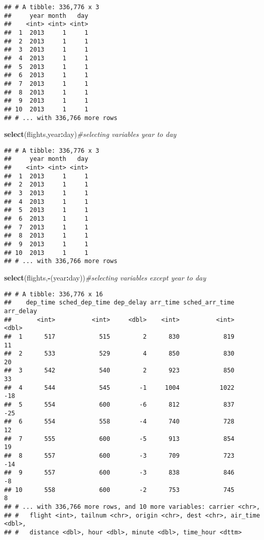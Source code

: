 \documentclass[]{article}
\newenvironment{Shaded}{\begin{snugshade}}{\end{snugshade}}
\newcommand{\CommentTok}[1]{\textcolor[rgb]{0.56,0.35,0.01}{\textit{#1}}}
\newcommand{\KeywordTok}[1]{\textcolor[rgb]{0.13,0.29,0.53}{\textbf{#1}}}
\newcommand{\NormalTok}[1]{#1}
\newcommand{\OperatorTok}[1]{\textcolor[rgb]{0.81,0.36,0.00}{\textbf{#1}}}
\begin{document}
\begin{verbatim}
## # A tibble: 336,776 x 3
##     year month   day
##    <int> <int> <int>
##  1  2013     1     1
##  2  2013     1     1
##  3  2013     1     1
##  4  2013     1     1
##  5  2013     1     1
##  6  2013     1     1
##  7  2013     1     1
##  8  2013     1     1
##  9  2013     1     1
## 10  2013     1     1
## # ... with 336,766 more rows
\end{verbatim}

\begin{Shaded}
\begin{Highlighting}[]
\KeywordTok{select}\NormalTok{(flights,year}\OperatorTok{:}\NormalTok{day)}\CommentTok{#selecting variables year to day}
\end{Highlighting}
\end{Shaded}

\begin{verbatim}
## # A tibble: 336,776 x 3
##     year month   day
##    <int> <int> <int>
##  1  2013     1     1
##  2  2013     1     1
##  3  2013     1     1
##  4  2013     1     1
##  5  2013     1     1
##  6  2013     1     1
##  7  2013     1     1
##  8  2013     1     1
##  9  2013     1     1
## 10  2013     1     1
## # ... with 336,766 more rows
\end{verbatim}

\begin{Shaded}
\begin{Highlighting}[]
\KeywordTok{select}\NormalTok{(flights,}\OperatorTok{-}\NormalTok{(year}\OperatorTok{:}\NormalTok{day))}\CommentTok{#selecting variables except year to day}
\end{Highlighting}
\end{Shaded}

\begin{verbatim}
## # A tibble: 336,776 x 16
##    dep_time sched_dep_time dep_delay arr_time sched_arr_time arr_delay
##       <int>          <int>     <dbl>    <int>          <int>     <dbl>
##  1      517            515         2      830            819        11
##  2      533            529         4      850            830        20
##  3      542            540         2      923            850        33
##  4      544            545        -1     1004           1022       -18
##  5      554            600        -6      812            837       -25
##  6      554            558        -4      740            728        12
##  7      555            600        -5      913            854        19
##  8      557            600        -3      709            723       -14
##  9      557            600        -3      838            846        -8
## 10      558            600        -2      753            745         8
## # ... with 336,766 more rows, and 10 more variables: carrier <chr>,
## #   flight <int>, tailnum <chr>, origin <chr>, dest <chr>, air_time <dbl>,
## #   distance <dbl>, hour <dbl>, minute <dbl>, time_hour <dttm>
\end{verbatim}
\end{document}
